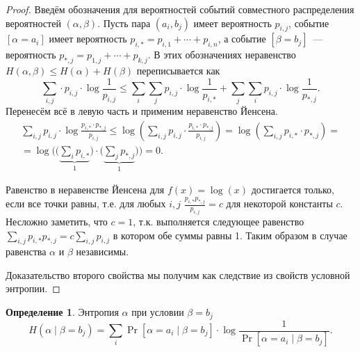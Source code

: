 \documentclass[12pt]{article}
\theoremstyle{definition}
\newtheorem{definition}{Определение}[section]
\theoremstyle{plain}
\theoremstyle{remark}
\begin{document}
\begin{proof}
Введём обозначения для вероятностей событий совместного распределения вероятностей \((\alpha, \beta)\). Пусть пара \((a_i, b_j)\) имеет вероятность \(p_{i,j}\), событие \([\alpha=a_i]\) имеет вероятность \(p_{i,*} = p_{i,1} + \dotsb + p_{i,n}\), а событие 
\([\beta=b_j]\)~--- вероятность \(p_{*,j} = p_{1,j} + \dotsb + p_{k,j}\). В этих обозначениях неравенство \(H(\alpha, \beta) \le H(\alpha) + H(\beta)\) переписывается как
\[
\sum_{i,j}\cdot p_{i,j}\cdot \log\frac1{p_{i,j}} \le
\sum_{i}\sum_{j} p_{i,j}\cdot \log\frac1{p_{i,*}} +
\sum_{j}\sum_{i} p_{i,j}\cdot \log\frac1{p_{*,j}}.
\]
Перенесём всё в левую часть и применим неравенство Йенсена.
\begin{multline*}
\sum_{i,j}p_{i,j}\cdot \log\frac{p_{i,*}\cdot p_{*,j}}{p_{i,j}} \le
\log\left(\sum_{i,j}p_{i,j}\cdot \frac{p_{i,*}\cdot p_{*,j}}{p_{i,j}}\right) =
\log\left(\sum_{i,j}p_{i,*}\cdot p_{*,j}\right) = \\
= \log \Biggl(\biggl(\underbrace{\sum_{i}p_{i,*}}_1\biggr)\cdot
     \biggl(\underbrace{\sum_{j}p_{*,j}}_1\biggr)\Biggr) = 0.
\end{multline*}

Равенство в неравенстве Йенсена для $f(x) = \log(x)$ достигается только, если все точки равны, т.е. 
для любых \(i,j\) \(\frac{p_{i,*}p_{*,j}}{p_{i,j}} = c\) для некоторой константы \(c\). Несложно заметить, что \(c =
1\), т.к. выполняется следующее равенство \(\sum_{i,j} {p_{i,*}p_{*,j}} = c \sum_{i,j}{p_{i,j}}\) в котором обе суммы
равны 1. Таким образом в случае равенства \(\alpha\) и \(\beta\) независимы.

Доказательство второго свойства мы получим как следствие из свойств условной энтропии.
\end{proof}

\begin{definition}\label{def:cond-entropy1}
Энтропия \(\alpha\) при условии \(\beta = b_j\)
\[H(\alpha\mid\beta = b_j) = \sum_i \Pr[\alpha = a_i\mid \beta = b_j]\cdot
    \log\frac{1}{\Pr[\alpha = a_i\mid \beta = b_j]}. \]
\end{definition}
\end{document}
